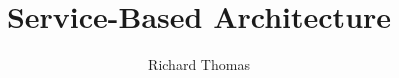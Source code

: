 \documentclass{csse4400}
\title{Service-Based Architecture}
\author{Richard Thomas}
\date{\week{4}}
\begin{document}
\makecover



%
%
\end{document}
